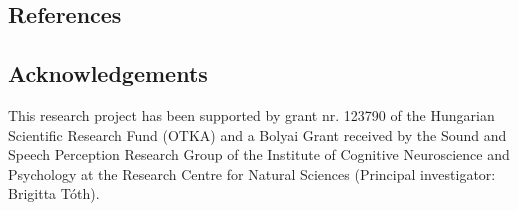 \documentclass[a0,portrait]{a0poster}
\begin{document}
\begin{multicols}{2}
\vspace{100pt}
\subsection*{References}
\AtNextBibliography{\tiny}
\printbibliography[heading=none]


\subsection*{Acknowledgements}
\tiny
This research project has been supported by grant nr. 123790 of the Hungarian Scientific Research Fund (OTKA) and a Bolyai Grant received by the Sound and Speech Perception Research Group of the Institute of Cognitive Neuroscience and Psychology at the Research Centre for Natural Sciences (Principal investigator: Brigitta Tóth).


\end{multicols}
\end{document}
